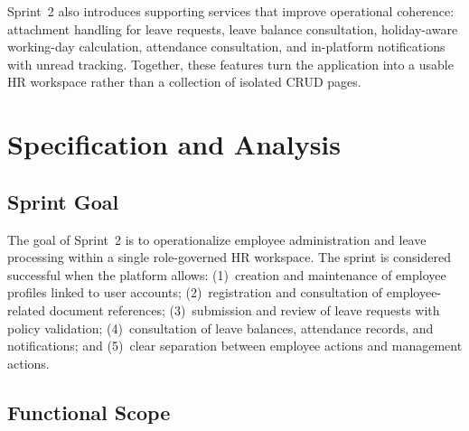 Sprint~2 also introduces supporting services that improve operational coherence: attachment
handling for leave requests, leave balance consultation, holiday-aware working-day calculation,
attendance consultation, and in-platform notifications with unread tracking. Together, these
features turn the application into a usable HR workspace rather than a collection of isolated
CRUD pages.

\section{Specification and Analysis}\label{sec:s2_analysis}

\subsection{Sprint Goal}

The goal of Sprint~2 is to operationalize employee administration and leave processing within a
single role-governed HR workspace. The sprint is considered successful when the platform allows:
(1)~creation and maintenance of employee profiles linked to user accounts; (2)~registration and
consultation of employee-related document references; (3)~submission and review of leave
requests with policy validation; (4)~consultation of leave balances, attendance records, and
notifications; and (5)~clear separation between employee actions and management actions.

\subsection{Functional Scope}

